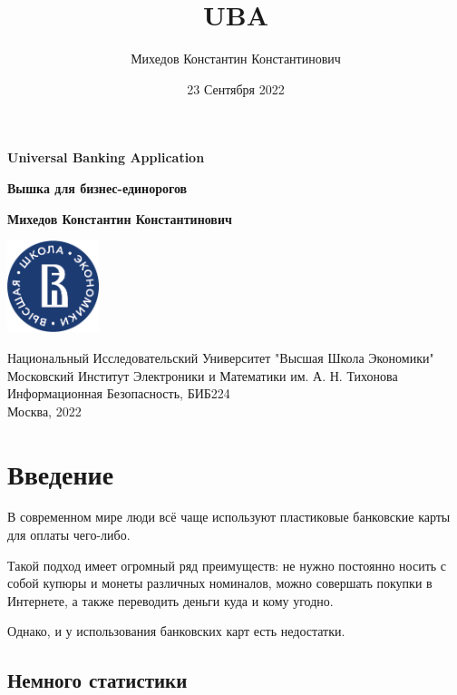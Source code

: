 \documentclass[a4paper,12pt]{article}
\title{UBA}
\author{Михедов Константин Константинович}
\date{23 Сентября 2022}
\begin{document}
    \begin{titlepage}
        \begin{center}
            \vspace*{1.5cm}

            \Huge
            \textbf{Universal Banking Application}

            \vspace{0.5cm} \large
            \textbf{Вышка для бизнес-единорогов}

            \vspace{1.5cm} \normalsize
            \textbf{Михедов Константин Константинович}

            \vfill

            \includegraphics[width=0.2\textwidth]{hse_logo}

            \vspace{1cm} \footnotesize
            Национальный Исследовательский Университет "Высшая Школа Экономики" \\
            Московский Институт Электроники и Математики им. А. Н. Тихонова \\
            Информационная Безопасность, БИБ224 \\
            Москва, 2022
        \end{center}
    \end{titlepage}

    \section{Введение}

    В современном мире люди всё чаще используют пластиковые
    банковские карты для оплаты чего-либо.

    Такой подход имеет огромный ряд преимуществ: не нужно постоянно
    носить с собой купюры и монеты различных номиналов, можно совершать
    покупки в Интернете, а также переводить
    деньги куда и кому угодно.
    
    Однако, и у использования банковских карт есть недостатки.

    \subsection{Немного статистики}
\end{document}

